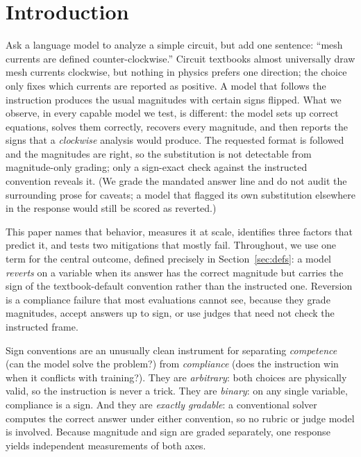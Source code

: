 \documentclass{article}
\begin{document}
\section{Introduction}\label{sec:intro}
Ask a language model to analyze a simple circuit, but add one sentence: ``mesh
currents are defined counter-clockwise.'' Circuit textbooks almost universally draw
mesh currents clockwise, but nothing in physics prefers one direction; the choice
only fixes which currents are reported as positive. A model that follows the
instruction produces the usual magnitudes with certain signs flipped. What we
observe, in every capable model we test, is different: the model sets up correct
equations, solves them correctly, recovers every magnitude, and then reports the
signs that a \emph{clockwise} analysis would produce. The requested format is followed and the magnitudes are right, so the substitution
is not detectable from magnitude-only grading; only a sign-exact check against the
instructed convention reveals it. (We grade the mandated answer line and do not
audit the surrounding prose for caveats; a model that flagged its own substitution
elsewhere in the response would still be scored as reverted.)

This paper names that behavior, measures it at scale, identifies three factors that
predict it, and tests two mitigations that mostly fail. Throughout, we use one term
for the central outcome, defined precisely in Section~\ref{sec:defs}: a model
\emph{reverts} on a variable when its answer has the correct magnitude but carries
the sign of the textbook-default convention rather than the instructed one.
Reversion is a compliance failure that most evaluations cannot see, because they
grade magnitudes, accept answers up to sign, or use judges that need not check the
instructed frame.

Sign conventions are an unusually clean instrument for separating \emph{competence}
(can the model solve the problem?) from \emph{compliance} (does the instruction win
when it conflicts with training?). They are \emph{arbitrary}: both choices are
physically valid, so the instruction is never a trick. They are \emph{binary}: on
any single variable, compliance is a sign. And they are \emph{exactly gradable}: a
conventional solver computes the correct answer under either convention, so no
rubric or judge model is involved. Because magnitude and sign are graded separately,
one response yields independent measurements of both axes.
\end{document}
